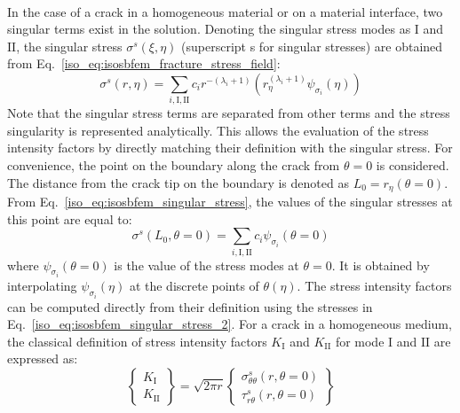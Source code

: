 \paragraph{}
In the case of a crack in a homogeneous material or on a material interface, two singular terms exist in the solution.
Denoting the singular stress modes as $\mathrm{I}$ and $\mathrm{II}$, the singular stress $\sigma^{s}(\xi,\eta)$ (superscript s for singular stresses) are obtained from Eq.~\ref{iso_eq:isosbfem_fracture_stress_field}:
\begin{equation}
    \sigma^s(r,\eta)
    =\sum_{i,\mathrm{I},\mathrm{II}}
    c_i r^{-(\lambda_i + 1)}
    (
        r_\eta^{(\lambda_i+1)}
        \psi_{\sigma_i}(\eta)
    )
\label{iso_eq:isosbfem_singular_stress}
\end{equation}
Note that the singular stress terms are separated from other terms and the stress singularity is represented analytically.
This allows the evaluation of the stress intensity factors by directly matching their definition with the singular stress.
For convenience, the point on the boundary along the crack from $\theta=0$ is considered.
The distance from the crack tip on the boundary is denoted as $L_0 = r_\eta(\theta=0)$.
From Eq.~\ref{iso_eq:isosbfem_singular_stress}, the values of the singular stresses at this point are equal to:
\begin{equation}
    \sigma^s (L_0, \theta = 0)
    =\sum_{i,\mathrm{I},\mathrm{II}}
    c_i \psi_{\sigma_i}(\theta=0)
    \label{iso_eq:isosbfem_singular_stress_2}
\end{equation}
where $\psi_{\sigma_i}(\theta=0)$ is the value of the stress modes at $\theta=0$.
It is obtained by interpolating $\psi_{\sigma_i}(\eta)$ at the discrete points of $\theta(\eta)$.
The stress intensity factors can be computed directly from their definition using the stresses in Eq.~\ref{iso_eq:isosbfem_singular_stress_2}.
For a crack in a homogeneous medium, the classical definition of stress intensity factors $K_{\mathrm{I}}$ and $K_{\mathrm{II}}$ for mode $\mathrm{I}$ and $\mathrm{II}$ are expressed as:
\begin{equation}
    \begin{Bmatrix}
        K_{\mathrm{I}}\\
        K_{\mathrm{II}}
    \end{Bmatrix}
    =\sqrt{2\pi r}
    \begin{Bmatrix}
        \sigma_{\theta\theta}^s(r,\theta=0) \\
        \tau_{r\theta}^s(r,\theta=0)
    \end{Bmatrix}
    \label{iso_eq:isosbfem_crack_homo}
\end{equation}
